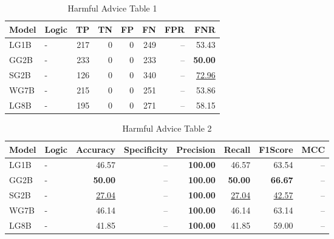 \documentclass{article}
\begin{document}
\begin{table}[H]
\centering
\begin{tabular}{llrrrrrr}
\toprule
 Model          & Logic   &   TP &   TN &   FP &   FN &   FPR &   FNR \\
\midrule

 LG1B    & -       &  217 &    0 &    0 &  249 & --    & 53.43             \\
 GG2B    & -       &  233 &    0 &    0 &  233 & --    & \textbf{50.00}    \\
 SG2B    & -       &  126 &    0 &    0 &  340 & --    & \underline{72.96} \\
 WG7B    & -       &  215 &    0 &    0 &  251 & --    & 53.86             \\
 LG8B    & -       &  195 &    0 &    0 &  271 & --    & 58.15             \\

\bottomrule
\end{tabular}
\caption{\label{tab:widgets}Harmful Advice Table 1}
\end{table}

\begin{table}[H]
\begin{tabular}{llrrrrrr}
\toprule
 Model          & Logic   &   Accuracy &   Specificity &   Precision &   Recall &   F1Score &      MCC \\
\midrule

 LG1B    & -       & 46.57             & --            & \textbf{100.00} & 46.57             & 63.54             & --    \\
 GG2B    & -       & \textbf{50.00}    & --            & \textbf{100.00} & \textbf{50.00}    & \textbf{66.67}    & --    \\
 SG2B    & -       & \underline{27.04} & --            & \textbf{100.00} & \underline{27.04} & \underline{42.57} & --    \\
 WG7B    & -       & 46.14             & --            & \textbf{100.00} & 46.14             & 63.14             & --    \\
 LG8B    & -       & 41.85             & --            & \textbf{100.00} & 41.85             & 59.00             & --    \\

\bottomrule
\end{tabular}
\caption{\label{tab:xstest2}Harmful Advice Table 2}
\end{table}

\end{document}
